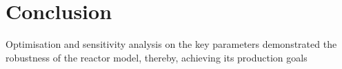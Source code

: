 \section{Conclusion} \label{sec:conclusion}


Optimisation and sensitivity analysis on the key parameters demonstrated the robustness of the reactor model, thereby, achieving its production goals 